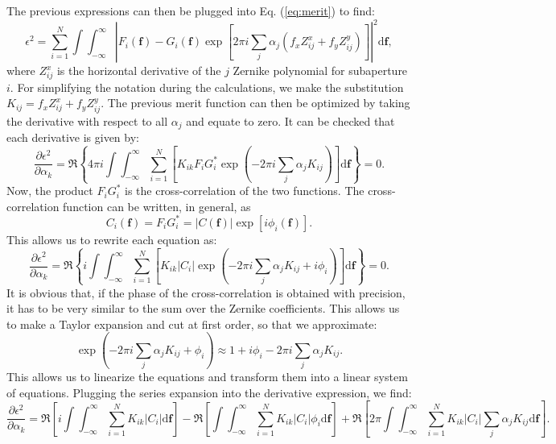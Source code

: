 \documentclass[iop,onecolumn]{emulateapj}
\begin{document}
The previous expressions can then be plugged into Eq. (\ref{eq:merit}) to find:
\begin{equation}
\epsilon^2 = \sum_{i=1}^N  
\int \int_{-\infty}^{\infty} \left| F_i(\mathbf{f}) - G_i(\mathbf{f}) \exp \left[ 2\pi i \sum_j \alpha_j \left(
f_x Z_{ij}^x + f_y Z_{ij}^y \right) \right] \right|^2 \mathrm{d}\mathbf{f},
\end{equation}
where $Z_{ij}^x$ is the horizontal derivative of the $j$ Zernike polynomial for subaperture $i$.
For simplifying the notation during the calculations, we make the substitution $K_{ij}=f_x Z_{ij}^x + f_y Z_{ij}^y$.
The previous merit function can then be optimized by taking the derivative with respect to all
$\alpha_j$ and equate to zero. It can be checked that each derivative is given by:
\begin{equation}
\frac{\partial \epsilon^2}{\partial \alpha_k} = \Re \left\{ 4\pi i   
\int \int_{-\infty}^{\infty} \sum_{i=1}^N \left[ K_{ik} F_i G_i^* \exp \left( -2\pi i \sum_j \alpha_j 
K_{ij} \right) \right] \mathrm{d}\mathbf{f} \right\}=0.
\end{equation}
Now, the product $F_i G_i^*$ is the cross-correlation of the two functions. The cross-correlation
function can be written, in general, as 
\begin{equation}
C_i(\mathbf{f}) = F_i G_i^* = |C(\mathbf{f})| \exp \left[ i \phi_i(\mathbf{f}) \right].
\end{equation}
This allows us to rewrite each equation as:
\begin{equation}
\frac{\partial \epsilon^2}{\partial \alpha_k} = \Re \left\{ i   
\int \int_{-\infty}^{\infty} \sum_{i=1}^N \left[ K_{ik} |C_i| \exp \left( -2\pi i \sum_j \alpha_j 
K_{ij} + i \phi_i \right) \right] \mathrm{d}\mathbf{f} \right\}=0.
\end{equation}
It is obvious that, if the phase of the cross-correlation is obtained with precision, it has
to be very similar to the sum over the Zernike coefficients. This allows us to make a Taylor
expansion and cut at first order, so that we approximate:
\begin{equation}
\exp \left( -2\pi i \sum_j \alpha_j 
K_{ij} + \phi_i \right) \approx 1 + i \phi_i -2\pi i \sum_j \alpha_j K_{ij}.
\end{equation}
This allows us to linearize the equations and transform them into a linear system of
equations. Plugging the series expansion into the derivative expression, we find:
\begin{equation}
\frac{\partial \epsilon^2}{\partial \alpha_k} = \Re \left[  i   
\int \int_{-\infty}^{\infty} \sum_{i=1}^N K_{ik} |C_i| \mathrm{d}\mathbf{f} \right]
- \Re \left[   
\int \int_{-\infty}^{\infty} \sum_{i=1}^N K_{ik} |C_i| \phi_i \mathrm{d}\mathbf{f} \right]
+ \Re \left[ 2\pi    
\int \int_{-\infty}^{\infty} \sum_{i=1}^N K_{ik} |C_i| \sum_j \alpha_j 
K_{ij} \mathrm{d}\mathbf{f} \right].
\end{equation}
\end{document}
